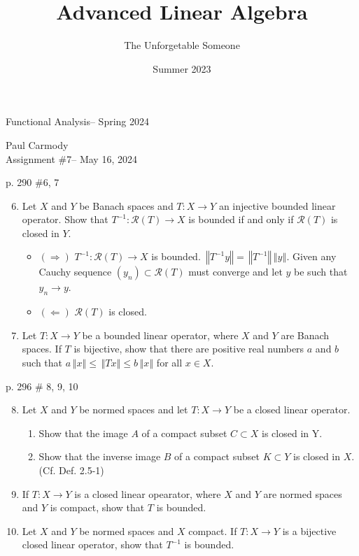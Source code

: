 \documentclass[10pt,a4paper]{report}
\title{Advanced Linear Algebra}
\author{The Unforgetable Someone}
\date{Summer 2023}
\newcommand{\CLASSNAME}{Functional Analysis}
\newcommand{\STUDENTNAME}{Paul Carmody}
\newcommand{\ASSIGNMENT}{Assignment \#7}
\newcommand{\DUEDATE}{May 16, 2024}
\newcommand{\SEMESTER}{Spring 2024}
\newcommand{\NORM}[1]{\,\left \Vert #1 \right \Vert}
\begin{document}
\begin{center}
	\Large{\CLASSNAME -- \SEMESTER} \\
\end{center}
\begin{center}
	\STUDENTNAME \\
	\ASSIGNMENT -- \DUEDATE\\
\end{center} 


p. 290 \#6, 7 
\begin{enumerate}
	\setcounter{enumi}{5}
	\item Let $X$ and $Y$ be Banach spaces and $T: X \to Y$ an injective bounded linear operator.  Show that $T^{-1}:\mathcal{R}(T) \to X$ is bounded if and only if $\mathcal{R}(T)$ is closed in $Y$.
	
	\begin{itemize}
		\item $(\Rightarrow)$ $T^{-1}:\mathcal{R}(T) \to X$ is bounded. $\NORM{T^{-1}y} = \NORM{T^{-1}}\NORM{y}$.  Given any Cauchy sequence $(y_n)\subset \mathcal{R}(T)$ must converge and let $y$ be such that $y_n \to y$.
		\item $(\Leftarrow)$ $\mathcal{R}(T)$ is closed.
	\end{itemize}
	
	\item Let $T: X \to Y$ be a bounded linear operator, where $X$ and $Y$ are Banach spaces.  If $T$ is bijective, show that there are positive real numbers $a$ and $b$ such that $a \NORM{x} \le \NORM{Tx}\le b  \NORM{x}$ for all $ x \in X$.
\end{enumerate}
\newpage p. 296 \# 8, 9, 10 
\begin{enumerate}
	\setcounter{enumi}{7}
	\item Let $X$ and $Y$ be normed spaces and let $T: X \to Y$ be a closed linear operator.  
	\begin{enumerate}
		\item Show that the image $A$ of a compact subset $C \subset X$ is closed in Y.
		\item Show that the inverse image $B$ of a compact subset $K \subset Y$ is closed in $X$.  (Cf. Def. 2.5-1)
	\end{enumerate}
	
	\item If $T: X \to Y$ is a closed linear opearator, where $X$ and $Y$ are normed spaces and $Y$ is compact, show that $T$ is bounded.
	
	\item Let $X$ and $Y$ be normed spaces and $X$ compact.  If $T: X \to Y$ is a bijective closed linear operator, show that $T^{-1}$ is bounded.

\end{enumerate}
\end{document}
